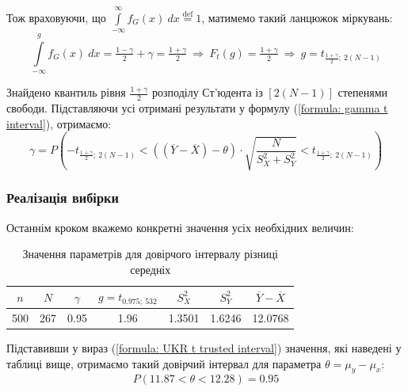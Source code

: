Тож враховуючи, що 
$\int\limits_{-\infty}^{\infty}f_G(x)\ dx \overset{\mathrm{def}}{=} 1$, матимемо такий ланцюжок міркувань:
\begin{equation*}
    \int\limits_{-\infty}^{g}f_G(x)\ dx=\tfrac{1-\gamma}{2}+\gamma=\tfrac{1+\gamma}{2}\ \Rightarrow\
        F_t(g)= \tfrac{1+\gamma}{2}\ \Rightarrow\ 
        g = t_{\frac{1+\gamma}{2};\ 2(N-1)}
\end{equation*} 

Знайдено квантиль рівня $\frac{1+\gamma}{2}$ розподілу Ст'юдента із $\left[ 2(N-1) \right]$ степенями свободи. Підставляючи 
усі отримані результати у формулу (\ref{formula: gamma t interval}), отримаємо:
\begin{equation}
    \gamma = P\left( 
        -t_{\tfrac{1+\gamma}{2};\ 2(N-1)} < 
        \left((\overline{Y}-\overline{X})-\theta\right)\cdot \sqrt{\frac{N}{S_X^2+S_Y^2}} < 
        t_{\tfrac{1+\gamma}{2};\ 2(N-1)} 
    \right) \label{formula: UKR t trusted interval}
\end{equation}

\subsubsection{Реалізація вибірки}

Останнім кроком вкажемо конкретні значення усіх необхідних величин:

\vspace{0.8cm}
\begin{table}[H]
    \begin{center}
        \begin{tabular}{||c|c|c|c|c|c|c||}
            \hline
            $n$ & $N$ & $\gamma$ & $g=t_{0.975;\ 532}$ & $S_X^2$ & $S_Y^2$ & $\overline{Y}-\overline{X}$ \\
            \hline \hline
            500 & 267 & 0.95 & 1.96 & 1.3501 & 1.6246 & 12.0768 \\
            \hline
        \end{tabular}
        \caption{Значення параметрів для довірчого інтервалу різниці середніх}
        \label{table: UKR t interval}
    \end{center}
\end{table}

Підставивши у вираз (\ref{formula: UKR t trusted interval}) значення, які наведені у таблиці вище, отримаємо 
такий довірчий інтервал для параметра $\theta=\mu_y-\mu_x$:
\begin{equation*}
    P(11.87 < \theta < 12.28)=0.95
\end{equation*}

